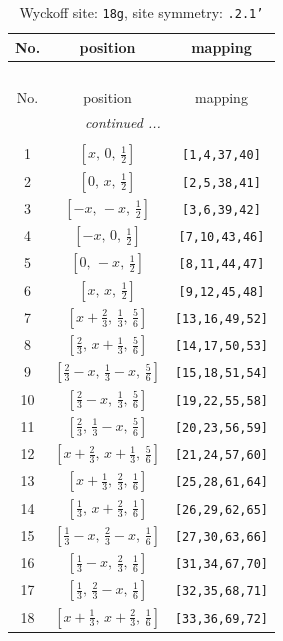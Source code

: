 \documentclass[fleqn,8pt]{jsarticle}
\begin{document}
\renewcommand{\arraystretch}{1.2}
\begin{longtable}{ccc}
\caption{Wyckoff site: {\tt 18g}, site symmetry: {\tt .2.1'}}
 \\
 \hline \hline
No. & position & mapping \\ \hline \endfirsthead

\multicolumn{2}{l}{\tablename\ \thetable{}} \\
 \hline \hline
No. & position & mapping \\ \hline \endhead

 \hline \hline
\multicolumn{2}{r}{\footnotesize\it continued ...} \\ \endfoot

 \hline \hline
\multicolumn{2}{r}{} \\ \endlastfoot

1 & $\left[ x,\, 0,\, \frac{1}{2} \right]$ & {\tt [1,4,37,40]} \\ \hline
2 & $\left[ 0,\, x,\, \frac{1}{2} \right]$ & {\tt [2,5,38,41]} \\ \hline
3 & $\left[ - x,\, - x,\, \frac{1}{2} \right]$ & {\tt [3,6,39,42]} \\ \hline
4 & $\left[ - x,\, 0,\, \frac{1}{2} \right]$ & {\tt [7,10,43,46]} \\ \hline
5 & $\left[ 0,\, - x,\, \frac{1}{2} \right]$ & {\tt [8,11,44,47]} \\ \hline
6 & $\left[ x,\, x,\, \frac{1}{2} \right]$ & {\tt [9,12,45,48]} \\ \hline
7 & $\left[ x + \frac{2}{3},\, \frac{1}{3},\, \frac{5}{6} \right]$ & {\tt [13,16,49,52]} \\ \hline
8 & $\left[ \frac{2}{3},\, x + \frac{1}{3},\, \frac{5}{6} \right]$ & {\tt [14,17,50,53]} \\ \hline
9 & $\left[ \frac{2}{3} - x,\, \frac{1}{3} - x,\, \frac{5}{6} \right]$ & {\tt [15,18,51,54]} \\ \hline
10 & $\left[ \frac{2}{3} - x,\, \frac{1}{3},\, \frac{5}{6} \right]$ & {\tt [19,22,55,58]} \\ \hline
11 & $\left[ \frac{2}{3},\, \frac{1}{3} - x,\, \frac{5}{6} \right]$ & {\tt [20,23,56,59]} \\ \hline
12 & $\left[ x + \frac{2}{3},\, x + \frac{1}{3},\, \frac{5}{6} \right]$ & {\tt [21,24,57,60]} \\ \hline
13 & $\left[ x + \frac{1}{3},\, \frac{2}{3},\, \frac{1}{6} \right]$ & {\tt [25,28,61,64]} \\ \hline
14 & $\left[ \frac{1}{3},\, x + \frac{2}{3},\, \frac{1}{6} \right]$ & {\tt [26,29,62,65]} \\ \hline
15 & $\left[ \frac{1}{3} - x,\, \frac{2}{3} - x,\, \frac{1}{6} \right]$ & {\tt [27,30,63,66]} \\ \hline
16 & $\left[ \frac{1}{3} - x,\, \frac{2}{3},\, \frac{1}{6} \right]$ & {\tt [31,34,67,70]} \\ \hline
17 & $\left[ \frac{1}{3},\, \frac{2}{3} - x,\, \frac{1}{6} \right]$ & {\tt [32,35,68,71]} \\ \hline
18 & $\left[ x + \frac{1}{3},\, x + \frac{2}{3},\, \frac{1}{6} \right]$ & {\tt [33,36,69,72]} \\
\end{longtable}
\end{document}

